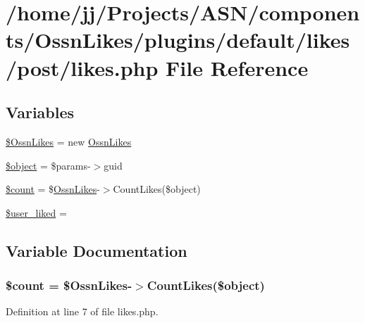 \hypertarget{likes_2post_2likes_8php}{}\section{/home/jj/\+Projects/\+A\+S\+N/components/\+Ossn\+Likes/plugins/default/likes/post/likes.php File Reference}
\label{likes_2post_2likes_8php}
\subsection*{Variables}
\begin{DoxyCompactItemize}
\item 
\hyperlink{likes_2post_2likes_8php_a227f36ff099a95468945a2fabc5c0782}{\$\+Ossn\+Likes} = new \hyperlink{class_ossn_likes}{Ossn\+Likes}
\item 
\hyperlink{likes_2post_2likes_8php_a52123b83a1952a68c5513e47d59ec4a6}{\$object} = \$params-\/$>$guid
\item 
\hyperlink{likes_2post_2likes_8php_af789423037bbc89dc7c850e761177570}{\$count} = \$\hyperlink{class_ossn_likes}{Ossn\+Likes}-\/$>$Count\+Likes(\$object)
\item 
\hyperlink{likes_2post_2likes_8php_a91d2960279c9a814ff24b9107b342bf5}{\$user\+\_\+liked} = \textquotesingle{}\textquotesingle{}
\end{DoxyCompactItemize}


\subsection{Variable Documentation}
\subsubsection[{\texorpdfstring{\$count}{$count}}]{\setlength{\rightskip}{0pt plus 5cm}\${\bf count} = \${\bf Ossn\+Likes}-\/$>$Count\+Likes(\$object)}\hypertarget{likes_2post_2likes_8php_af789423037bbc89dc7c850e761177570}{}\label{likes_2post_2likes_8php_af789423037bbc89dc7c850e761177570}


Definition at line 7 of file likes.\+php.

